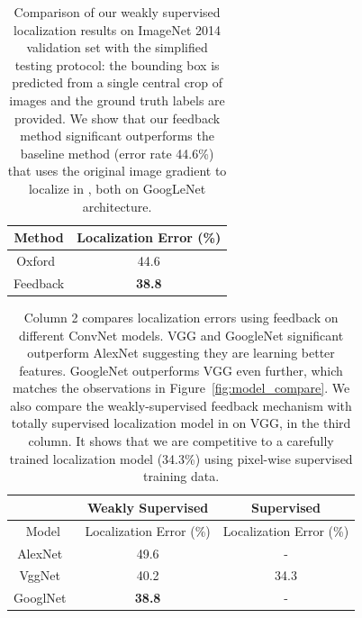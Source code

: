 \begin{table}[htb]
\centering
\small
\begin{tabular}{|c|c|}
\hline
Method & Localization Error (\%) \\ \hline
Oxford~\cite{simonyan2013deep} & 44.6 \\ \hline
Feedback & \textbf{38.8} \\ \hline
\end{tabular}
\caption{Comparison of our weakly supervised localization results on ImageNet 2014 validation set with the simplified testing protocol: the bounding box is predicted from a single central crop of images and the ground truth labels are provided.
We show that our feedback method significant outperforms the baseline method (error rate 44.6\%) that uses the original image gradient to localize in \cite{simonyan2013deep}, both on GoogLeNet architecture.
}
\label{tab:localization_accuracy}
\end{table}

\begin{table}[htb]
\centering
\small
\begin{tabular}{|c|c|c|}
\hline
                                      & Weakly Supervised             & Supervised              \\ \hline
Model                                 & Localization Error (\%)       & Localization Error (\%) \\ \hline
AlexNet~\cite{Krizhevsky2012ImageNet} & 49.6                          & -                       \\ \hline
VggNet~\cite{Simonyan2014Very}        & 40.2                          & 34.3\cite{Simonyan2014Very} \\ \hline
GooglNet~\cite{Szegedy2014Going}      & \textbf{38.8}                 & - \\ \hline
\end{tabular}
\caption{Column 2 compares localization errors using feedback on different ConvNet models. VGG and GoogleNet significant outperform AlexNet suggesting they are learning better features. GoogleNet outperforms VGG even further, which matches the observations in Figure~\ref{fig:model_compare}. We also compare the weakly-supervised feedback mechanism with totally supervised localization model in \cite{Simonyan2014Very} on VGG, in the third column. It shows that we are competitive to a carefully trained localization model (34.3\%) using pixel-wise supervised training data.}
\label{tab:localization_model_compare}
\end{table}

